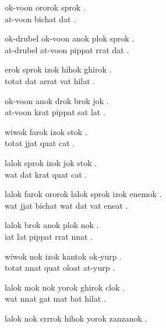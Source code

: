 \documentclass[a4paper, 12pt]{article}
\newlength{\lineseparation}
\begin{document}
\Large
\tt

 ok-voon ororok sprok . \\[\lineseparation]

 at-voon bichat dat .

\hrulefill

 ok-drubel ok-voon anok plok sprok . \\[\lineseparation]


 at-drubel at-voon pippat rrat dat . 

\hrulefill

 erok sprok izok hihok ghirok . \\[\lineseparation]


 totat dat arrat vat hilat . 

\hrulefill

 ok-voon anok drok brok jok . \\[\lineseparation]


 at-voon krat pippat sat lat . 

\hrulefill

 wiwok farok izok stok . \\[\lineseparation]


 totat jjat quat cat . 

\hrulefill

 lalok sprok izok jok stok . \\[\lineseparation]


 wat dat krat quat cat . 


 lalok farok ororok lalok sprok izok enemok . \\[\lineseparation]


wat jjat bichat wat dat vat eneat . 


\hrulefill

 lalok brok anok plok nok . \\[\lineseparation]


 iat lat pippat rrat nnat . 

\hrulefill

 wiwok nok izok kantok ok-yurp . \\[\lineseparation]


 totat nnat quat oloat at-yurp . 

\hrulefill

 lalok mok nok yorok ghirok clok . \\[\lineseparation]


 wat nnat gat mat bat hilat . 

\hrulefill

 lalok nok crrrok hihok yorok zanzanok . \\[\lineseparation]
\end{document}
